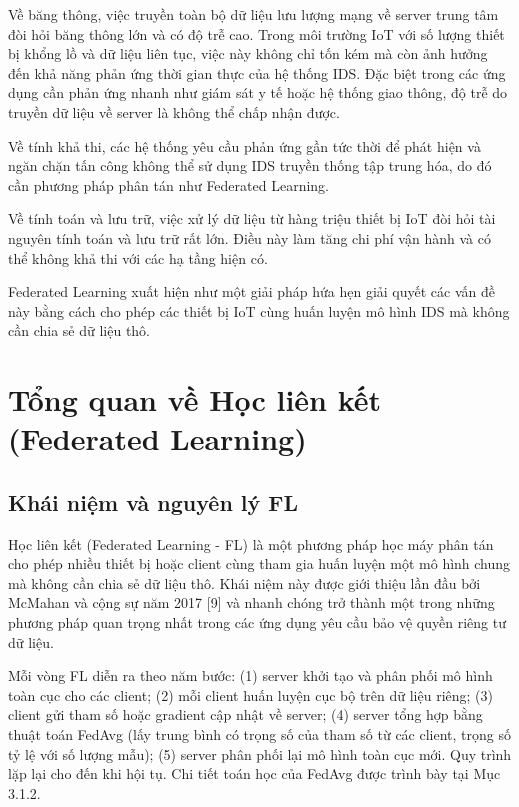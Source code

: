Về băng thông, việc truyền toàn bộ dữ liệu lưu lượng mạng về server trung tâm đòi hỏi băng thông lớn và có độ trễ cao. Trong môi trường IoT với số lượng thiết bị khổng lồ và dữ liệu liên tục, việc này không chỉ tốn kém mà còn ảnh hưởng đến khả năng phản ứng thời gian thực của hệ thống IDS. Đặc biệt trong các ứng dụng cần phản ứng nhanh như giám sát y tế hoặc hệ thống giao thông, độ trễ do truyền dữ liệu về server là không thể chấp nhận được.

Về tính khả thi, các hệ thống yêu cầu phản ứng gần tức thời để phát hiện và ngăn chặn tấn công không thể sử dụng IDS truyền thống tập trung hóa, do đó cần phương pháp phân tán như Federated Learning.

Về tính toán và lưu trữ, việc xử lý dữ liệu từ hàng triệu thiết bị IoT đòi hỏi tài nguyên tính toán và lưu trữ rất lớn. Điều này làm tăng chi phí vận hành và có thể không khả thi với các hạ tầng hiện có.

Federated Learning xuất hiện như một giải pháp hứa hẹn giải quyết các vấn đề này bằng cách cho phép các thiết bị IoT cùng huấn luyện mô hình IDS mà không cần chia sẻ dữ liệu thô.

\section{Tổng quan về Học liên kết (Federated Learning)}

\subsection{Khái niệm và nguyên lý FL}
Học liên kết (Federated Learning - FL) là một phương pháp học máy phân tán cho phép nhiều thiết bị hoặc client cùng tham gia huấn luyện một mô hình chung mà không cần chia sẻ dữ liệu thô. Khái niệm này được giới thiệu lần đầu bởi McMahan và cộng sự năm 2017 {[}9{]} và nhanh chóng trở thành một trong những phương pháp quan trọng nhất trong các ứng dụng yêu cầu bảo vệ quyền riêng tư dữ liệu.

Mỗi vòng FL diễn ra theo năm bước: (1) server khởi tạo và phân phối mô hình toàn cục cho các client; (2) mỗi client huấn luyện cục bộ trên dữ liệu riêng; (3) client gửi tham số hoặc gradient cập nhật về server; (4) server tổng hợp bằng thuật toán FedAvg (lấy trung bình có trọng số của tham số từ các client, trọng số tỷ lệ với số lượng mẫu); (5) server phân phối lại mô hình toàn cục mới. Quy trình lặp lại cho đến khi hội tụ. Chi tiết toán học của FedAvg được trình bày tại Mục 3.1.2.

